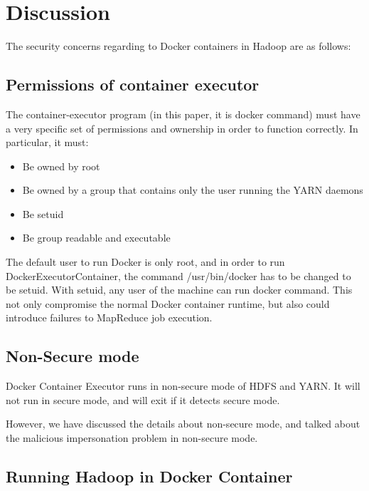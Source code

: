 \section{Discussion}
\label{sec:discussion}

\iffalse
Discussion (discuss some of the important simplifying assumptions, and
suggest possibilities for future work)
\fi

The security concerns regarding to Docker containers in Hadoop are as follows:

\subsection{Permissions of container executor}

The container-executor program (in this paper, it is docker command) must have a very specific set of permissions and ownership in order to function correctly. In particular, it must:
\begin{itemize}
\item {Be owned by root}
\item {Be owned by a group that contains only the user running the YARN daemons}
\item {Be setuid}
\item {Be group readable and executable}
\end{itemize}

The default user to run Docker is only root, and in order to run DockerExecutorContainer, the command /usr/bin/docker has to be changed to be setuid. With setuid, any user of the machine can run docker command. This not only compromise the normal Docker container runtime, but also could introduce failures to MapReduce job execution.

\subsection{Non-Secure mode}

Docker Container Executor runs in non-secure mode of HDFS and YARN. It will not run in secure mode, and will exit if it detects secure mode.

However, we have discussed the details about non-secure mode, and talked about the malicious impersonation problem in non-secure mode.

\subsection{Running Hadoop in Docker Container}

